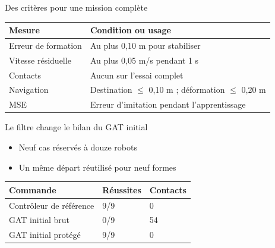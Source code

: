 \documentclass[aspectratio=169,11pt]{beamer}
\begin{document}
\begin{frame}{Des critères pour une mission complète}
\vspace{3mm}\begin{tabularx}{\textwidth}{lX}\toprule
\textbf{Mesure} & \textbf{Condition ou usage}\\[2mm]
\midrule
Erreur de formation & Au plus 0,10 m pour stabiliser\\[2mm]
Vitesse résiduelle & Au plus 0,05 m/s pendant 1 s\\[2mm]
Contacts & Aucun sur l’essai complet\\[2mm]
Navigation & Destination $\leq$ 0,10 m ; déformation $\leq$ 0,20 m\\[2mm]
MSE & Erreur d’imitation pendant l’apprentissage\\[2mm]
\bottomrule\end{tabularx}
\end{frame}

\begin{frame}{Le filtre change le bilan du GAT initial}
\begin{itemize}\setlength{\itemsep}{4mm}
\item Neuf cas réservés à douze robots
\item Un même départ réutilisé pour neuf formes
\end{itemize}
\vspace{3mm}\begin{tabularx}{\textwidth}{lXX}\toprule
\textbf{Commande} & \textbf{Réussites} & \textbf{Contacts}\\[2mm]
\midrule
Contrôleur de référence & 9/9 & 0\\[2mm]
GAT initial brut & 0/9 & 54\\[2mm]
GAT initial protégé & 9/9 & 0\\[2mm]
\bottomrule\end{tabularx}
\end{frame}
\end{document}
